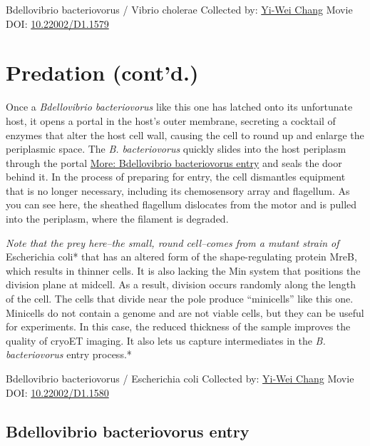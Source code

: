 \documentclass[]{tufte-book}
\begin{document}
\hypertarget{htmlwidget-0f6572629ce1cfb51a80}{}

\label{fig:9-9}Bdellovibrio bacteriovorus / Vibrio cholerae Collected by: \protect\hyperlink{yi-wei_chang}{Yi-Wei Chang} Movie DOI: \href{https://doi.org/10.22002/D1.1579}{10.22002/D1.1579}

\hypertarget{predation-contd.}{%
\section{Predation (cont'd.)}\label{predation-contd.}}

Once a \emph{Bdellovibrio bacteriovorus} like this one has latched onto its unfortunate host, it opens a portal in the host's outer membrane, secreting a cocktail of enzymes that alter the host cell wall, causing the cell to round up and enlarge the periplasmic space. The \emph{B. bacteriovorus} quickly slides into the host periplasm through the portal \protect\hyperlink{Bdellovibrio_bacteriovorus_entry}{More: Bdellovibrio bacteriovorus entry} and seals the door behind it. In the process of preparing for entry, the cell dismantles equipment that is no longer necessary, including its chemosensory array and flagellum. As you can see here, the sheathed flagellum dislocates from the motor and is pulled into the periplasm, where the filament is degraded.

\emph{Note that the prey here--the small, round cell--comes from a mutant strain of }Escherichia coli* that has an altered form of the shape-regulating protein MreB, which results in thinner cells. It is also lacking the Min system that positions the division plane at midcell. As a result, division occurs randomly along the length of the cell. The cells that divide near the pole produce ``minicells'' like this one. Minicells do not contain a genome and are not viable cells, but they can be useful for experiments. In this case, the reduced thickness of the sample improves the quality of cryoET imaging. It also lets us capture intermediates in the \emph{B. bacteriovorus} entry process.*



\hypertarget{htmlwidget-725338c58ad9fe2f4162}{}

\label{fig:9-10}Bdellovibrio bacteriovorus / Escherichia coli Collected by: \protect\hyperlink{yi-wei_chang}{Yi-Wei Chang} Movie DOI: \href{https://doi.org/10.22002/D1.1580}{10.22002/D1.1580}

\hypertarget{Bdellovibrio_bacteriovorus_entry}{%
\subsection{Bdellovibrio bacteriovorus entry}\label{Bdellovibrio_bacteriovorus_entry}}
\end{document}
